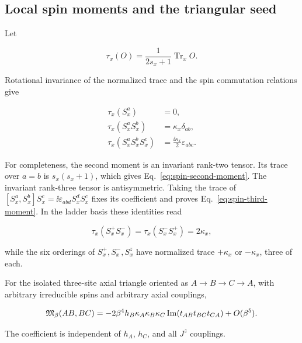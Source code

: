\subsection{Local spin moments and the triangular seed}
\label{sec:arbitrary-spin-triangle}

Let

\begin{equation}
 \tau_x(O)=\frac{1}{2s_x+1}\operatorname{Tr}_x O.
 \label{eq:local-normalized-trace}
\end{equation}

Rotational invariance of the normalized trace and the spin commutation
relations give

\begin{align}
 \tau_x(S_x^a)&=0,
 \label{eq:spin-first-moment}\\
 \tau_x(S_x^aS_x^b)&=\kappa_x\delta_{ab},
 \label{eq:spin-second-moment}\\
 \tau_x(S_x^aS_x^bS_x^c)
 &=\frac{\ii\kappa_x}{2}\varepsilon_{abc}.
 \label{eq:spin-third-moment}
\end{align}

For completeness, the second moment is an invariant rank-two tensor.  Its
trace over $a=b$ is $s_x(s_x+1)$, which gives
Eq.~\eqref{eq:spin-second-moment}.  The invariant rank-three tensor is
antisymmetric.  Taking the trace of
$[S_x^a,S_x^b]S_x^c=\ii\varepsilon_{abd}S_x^dS_x^c$ fixes its coefficient
and proves Eq.~\eqref{eq:spin-third-moment}.  In the ladder basis these
identities read

\begin{equation}
 \tau_x(S_x^+S_x^-)=\tau_x(S_x^-S_x^+)=2\kappa_x,
 \label{eq:spin-ladder-second-moment}
\end{equation}

while the six orderings of $S_x^+,S_x^-,S_x^z$ have normalized trace
$+\kappa_x$ or $-\kappa_x$, three of each.

\begin{proposition}
\label{prop:arbitrary-spin-triangle}
For the isolated three-site axial triangle oriented as
$A\to B\to C\to A$, with arbitrary irreducible spins and arbitrary axial
couplings,

\begin{equation}
 \mathfrak{M}_\beta(AB,BC)
 =-2\beta^4h_B\kappa_A\kappa_B\kappa_C
 \operatorname{Im}(t_{AB}t_{BC}t_{CA})+O(\beta^5).
 \label{eq:arbitrary-spin-triangle}
\end{equation}

The coefficient is independent of $h_A$, $h_C$, and all $J^z$ couplings.
\end{proposition}

